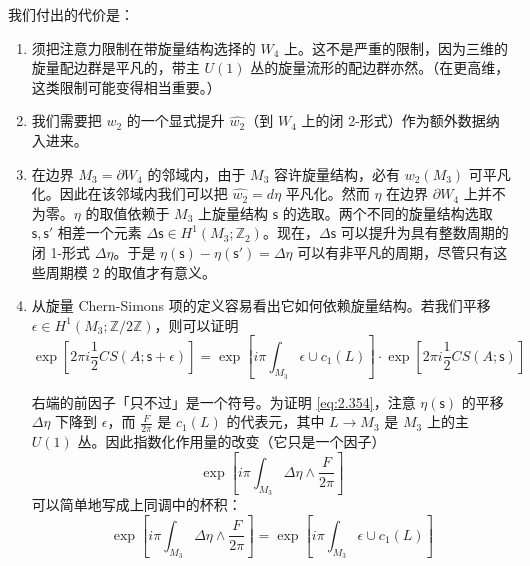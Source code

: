 我们付出的代价是：

\begin{enumerate}
  \item 须把注意力限制在带旋量结构选择的 $W_4$ 上。这不是严重的限制，因为三维的旋量配边群是平凡的，带主 $U(1)$ 丛的旋量流形的配边群亦然。（在更高维，这类限制可能变得相当重要。）

  \item 我们需要把 $w_2$ 的一个显式提升 $\widehat{w_2}$（到 $W_4$ 上的闭 2-形式）作为额外数据纳入进来。

  \item 在边界 $M_3=\partial W_4$ 的邻域内，由于 $M_3$ 容许旋量结构，必有 $w_2(M_3)$ 可平凡化。因此在该邻域内我们可以把 $\widehat{w_2}=d\eta$ 平凡化。然而 $\eta$ 在边界 $\partial W_4$ 上并不为零。$\eta$ 的取值依赖于 $M_3$ 上旋量结构 $\mathsf{s}$ 的选取。两个不同的旋量结构选取 $\mathsf{s},\mathsf{s}'$ 相差一个元素 $\Delta\mathsf{s}\in H^1(M_3;\mathbb{Z}_2)$。现在，$\Delta\mathsf{s}$ 可以提升为具有整数周期的闭 1-形式 $\Delta\eta$。于是 $\eta(\mathsf{s})-\eta(\mathsf{s}')=\Delta\eta$ 可以有非平凡的周期，尽管只有这些周期模 2 的取值才有意义。

  \item 从旋量 Chern-Simons 项的定义容易看出它如何依赖旋量结构。若我们平移 $\epsilon\in H^1(M_3;\mathbb{Z}/2\mathbb{Z})$，则可以证明
  \begin{equation}
    \exp\left[2\pi i\frac12CS(A;\mathsf{s}+\epsilon)\right]
    =\exp\left[i\pi\int_{M_3}\epsilon\cup c_1(L)\right]\cdot
    \exp\left[2\pi i\frac12CS(A;\mathsf{s})\right]
    \tag{2.354}
    \label{eq:2.354}
  \end{equation}

  右端的前因子「只不过」是一个符号。为证明 \eqref{eq:2.354}，注意 $\eta(\mathsf{s})$ 的平移 $\Delta\eta$ 下降到 $\epsilon$，而 $\frac{F}{2\pi}$ 是 $c_1(L)$ 的代表元，其中 $L\to M_3$ 是 $M_3$ 上的主 $U(1)$ 丛。因此指数化作用量的改变（它只是一个因子）
  \begin{equation}
    \exp\left[i\pi\int_{M_3}\Delta\eta\wedge\frac{F}{2\pi}\right]
    \tag{2.355}
    \label{eq:2.355}
  \end{equation}
  可以简单地写成上同调中的杯积：
  \begin{equation}
    \exp\left[i\pi\int_{M_3}\Delta\eta\wedge\frac{F}{2\pi}\right]
    =\exp\left[i\pi\int_{M_3}\epsilon\cup c_1(L)\right]
    \tag{2.356}
    \label{eq:2.356}
  \end{equation}
\end{enumerate}

